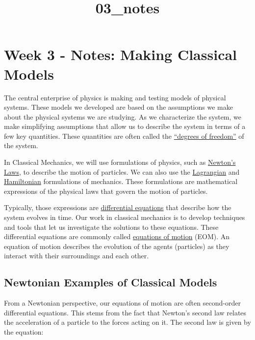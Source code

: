 \documentclass[11pt]{article}
\title{03\_notes}
\begin{document}
    
    \maketitle
    
    

    
    \section{Week 3 - Notes: Making Classical
Models}\label{week-3---notes-making-classical-models}

The central enterprise of physics is making and testing models of
physical systems. These models we developed are based on the assumptions
we make about the physical systems we are studying. As we characterize
the system, we make simplifying assumptions that allow us to describe
the system in terms of a few key quantities. These quantities are often
called the
\href{https://en.wikipedia.org/wiki/Degrees_of_freedom_(physics_and_chemistry)}{``degrees
of freedom''} of the system.

In Classical Mechanics, we will use formulations of physics, such as
\href{https://en.wikipedia.org/wiki/Newton\%27s_laws_of_motion}{Newton's
Laws}, to describe the motion of particles. We can also use the
\href{https://en.wikipedia.org/wiki/Lagrangian_mechanics}{Lagrangian}
and
\href{https://en.wikipedia.org/wiki/Hamiltonian_mechanics}{Hamiltonian}
formulations of mechanics. These formulations are mathematical
expressions of the physical laws that govern the motion of particles.

Typically, those expressions are
\href{https://en.wikipedia.org/wiki/Differential_equation}{differential
equations} that describe how the system evolves in time. Our work in
classical mechanics is to develop techniques and tools that let us
investigate the solutions to these equations. These differential
equations are commonly called
\href{https://en.wikipedia.org/wiki/Equations_of_motion}{equations of
motion} (EOM). An equation of motion describes the evolution of the
agents (particles) as they interact with their surroundings and each
other.

    \subsection{Newtonian Examples of Classical
Models}\label{newtonian-examples-of-classical-models}

From a Newtonian perspective, our equations of motion are often
second-order differential equations. This stems from the fact that
Newton's second law relates the acceleration of a particle to the forces
acting on it. The second law is given by the equation:
\end{document}
